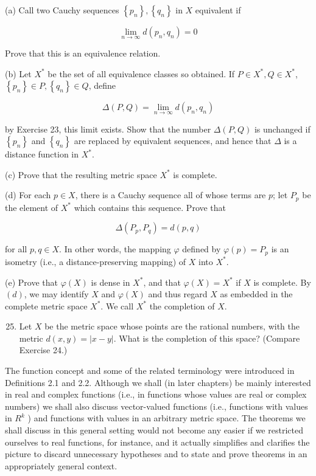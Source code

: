 \documentclass[10pt]{article}
\begin{document}
(a) Call two Cauchy sequences $\left\{p_{n}\right\},\left\{q_{n}\right\}$ in $X$ equivalent if

$$
\lim _{n \rightarrow \infty} d\left(p_{n}, q_{n}\right)=0
$$

Prove that this is an equivalence relation.

(b) Let $X^{*}$ be the set of all equivalence classes so obtained. If $P \in X^{*}, Q \in X^{*}$, $\left\{p_{n}\right\} \in P,\left\{q_{n}\right\} \in Q$, define

$$
\Delta(P, Q)=\lim _{n \rightarrow \infty} d\left(p_{n}, q_{n}\right)
$$

by Exercise 23, this limit exists. Show that the number $\Delta(P, Q)$ is unchanged if $\left\{p_{n}\right\}$ and $\left\{q_{n}\right\}$ are replaced by equivalent sequences, and hence that $\Delta$ is a distance function in $X^{*}$.

(c) Prove that the resulting metric space $X^{*}$ is complete.

(d) For each $p \in X$, there is a Cauchy sequence all of whose terms are $p$; let $P_{p}$ be the element of $X^{*}$ which contains this sequence. Prove that

$$
\Delta\left(P_{p}, P_{q}\right)=d(p, q)
$$

for all $p, q \in X$. In other words, the mapping $\varphi$ defined by $\varphi(p)=P_{p}$ is an isometry (i.e., a distance-preserving mapping) of $X$ into $X^{*}$.

(e) Prove that $\varphi(X)$ is dense in $X^{*}$, and that $\varphi(X)=X^{*}$ if $X$ is complete. By $(d)$, we may identify $X$ and $\varphi(X)$ and thus regard $X$ as embedded in the complete metric space $X^{*}$. We call $X^{*}$ the completion of $X$.

\begin{enumerate}
  \setcounter{enumi}{24}
  \item Let $X$ be the metric space whose points are the rational numbers, with the metric $d(x, y)=|x-y|$. What is the completion of this space? (Compare Exercise 24.)
\end{enumerate}

The function concept and some of the related terminology were introduced in Definitions 2.1 and 2.2. Although we shall (in later chapters) be mainly interested in real and complex functions (i.e., in functions whose values are real or complex numbers) we shall also discuss vector-valued functions (i.e., functions with values in $R^{k}$ ) and functions with values in an arbitrary metric space. The theorems we shall discuss in this general setting would not become any easier if we restricted ourselves to real functions, for instance, and it actually simplifies and clarifies the picture to discard unnecessary hypotheses and to state and prove theorems in an appropriately general context.
\end{document}
